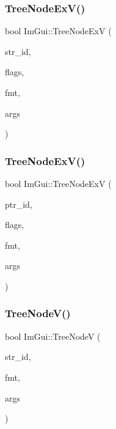 \hypertarget{namespace_im_gui_a251cd4acbdad4cef2246d9b573a83ce0}{}\label{namespace_im_gui_a251cd4acbdad4cef2246d9b573a83ce0} 
\subsubsection{\texorpdfstring{Tree\+Node\+Ex\+V()}{TreeNodeExV()}\hspace{0.1cm}{\footnotesize\ttfamily [1/2]}}
{\footnotesize\ttfamily bool Im\+Gui\+::\+Tree\+Node\+ExV (\begin{DoxyParamCaption}\item[{const char $\ast$}]{str\+\_\+id,  }\item[{Im\+Gui\+Tree\+Node\+Flags}]{flags,  }\item[{const char $\ast$}]{fmt,  }\item[{va\+\_\+list}]{args }\end{DoxyParamCaption})}

\hypertarget{namespace_im_gui_aaae827898572d17e064a88a1afc8e6b0}{}\label{namespace_im_gui_aaae827898572d17e064a88a1afc8e6b0} 
\subsubsection{\texorpdfstring{Tree\+Node\+Ex\+V()}{TreeNodeExV()}\hspace{0.1cm}{\footnotesize\ttfamily [2/2]}}
{\footnotesize\ttfamily bool Im\+Gui\+::\+Tree\+Node\+ExV (\begin{DoxyParamCaption}\item[{const void $\ast$}]{ptr\+\_\+id,  }\item[{Im\+Gui\+Tree\+Node\+Flags}]{flags,  }\item[{const char $\ast$}]{fmt,  }\item[{va\+\_\+list}]{args }\end{DoxyParamCaption})}

\hypertarget{namespace_im_gui_a9bc1075c583973d76d8d65ea89787453}{}\label{namespace_im_gui_a9bc1075c583973d76d8d65ea89787453} 
\subsubsection{\texorpdfstring{Tree\+Node\+V()}{TreeNodeV()}\hspace{0.1cm}{\footnotesize\ttfamily [1/2]}}
{\footnotesize\ttfamily bool Im\+Gui\+::\+Tree\+NodeV (\begin{DoxyParamCaption}\item[{const char $\ast$}]{str\+\_\+id,  }\item[{const char $\ast$}]{fmt,  }\item[{va\+\_\+list}]{args }\end{DoxyParamCaption})}


